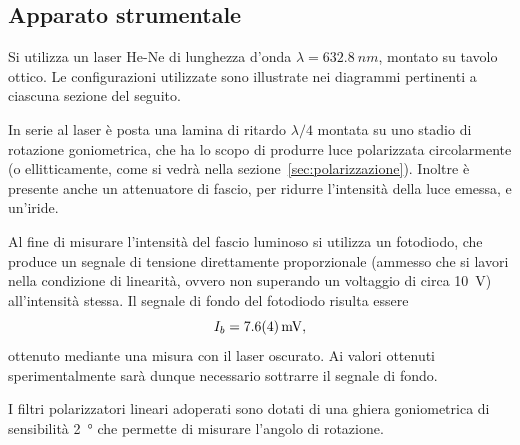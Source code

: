 \documentclass[10pt,oneside,a4paper]{article}
\begin{document}
\begin{multicols}{2}
\section{Apparato strumentale}

Si utilizza un laser He-Ne di lunghezza d'onda $\lambda = \SI{632.8}{nm}$, montato su tavolo ottico. Le configurazioni utilizzate sono illustrate nei diagrammi pertinenti a ciascuna sezione del seguito.

In serie al laser è posta una lamina di ritardo $\lambda / 4$ montata su uno stadio di rotazione goniometrica, che ha lo scopo di produrre luce polarizzata circolarmente (o ellitticamente, come si vedrà nella sezione~\ref{sec:polarizzazione}). Inoltre è presente anche un attenuatore di fascio, per ridurre l'intensità della luce emessa, e un'iride.

Al fine di misurare l'intensità del fascio luminoso si utilizza un fotodiodo, che produce un segnale di tensione direttamente proporzionale (ammesso che si lavori nella condizione di linearità, ovvero non superando un voltaggio di circa \SI{10}{V}) all'intensità stessa. Il segnale di fondo del fotodiodo risulta essere 
\[
I_b = \SI{7.6 \pm 0.4}{mV},
\]
ottenuto mediante una misura con il laser oscurato. Ai valori ottenuti sperimentalmente sarà dunque necessario sottrarre il segnale di fondo.

I filtri polarizzatori lineari adoperati sono dotati di una ghiera goniometrica di sensibilità \SI{2}{\degree} che permette di misurare l'angolo di rotazione.












\end{multicols}
\end{document}
